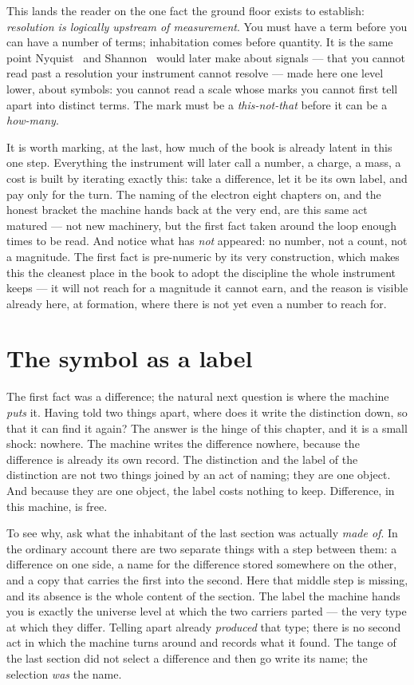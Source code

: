 This lands the reader on the one fact the ground floor exists to establish: \emph{resolution is logically upstream of
measurement}. You must have a term before you can have a number of terms; inhabitation comes before quantity. It is
the same point Nyquist~\cite{nyquist1928} and Shannon~\cite{shannon1948} would later make about signals --- that you
cannot read past a resolution your instrument cannot resolve --- made here one level lower, about symbols: you cannot
read a scale whose marks you cannot first tell apart into distinct terms. The mark must be a \emph{this-not-that}
before it can be a \emph{how-many}.

It is worth marking, at the last, how much of the book is already latent in this one step. Everything the instrument
will later call a number, a charge, a mass, a cost is built by iterating exactly this: take a difference, let it be
its own label, and pay only for the turn. The naming of the electron eight chapters on, and the honest bracket the
machine hands back at the very end, are this same act matured --- not new machinery, but the first fact taken around
the loop enough times to be read. And notice what has \emph{not} appeared: no number, not a count, not a magnitude.
The first fact is pre-numeric by its very construction, which makes this the cleanest place in the book to adopt the
discipline the whole instrument keeps --- it will not reach for a magnitude it cannot earn, and the reason is visible
already here, at formation, where there is not yet even a number to reach for.

\section{The symbol as a label}

The first fact was a difference; the natural next question is where the machine \emph{puts} it. Having told two things
apart, where does it write the distinction down, so that it can find it again? The answer is the hinge of this chapter,
and it is a small shock: nowhere. The machine writes the difference nowhere, because the difference is already its own
record. The distinction and the label of the distinction are not two things joined by an act of naming; they are one
object. And because they are one object, the label costs nothing to keep. Difference, in this machine, is free.

To see why, ask what the inhabitant of the last section was actually \emph{made of}. In the ordinary account there are
two separate things with a step between them: a difference on one side, a name for the difference stored somewhere on
the other, and a copy that carries the first into the second. Here that middle step is missing, and its absence is the
whole content of the section. The label the machine hands you is exactly the universe level at which the two carriers
parted --- the very type at which they differ. Telling apart already \emph{produced} that type; there is no second act
in which the machine turns around and records what it found. The tange of the last section did not select a difference
and then go write its name; the selection \emph{was} the name.

